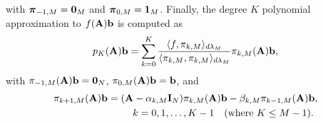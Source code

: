 \documentclass{article}
\begin{document}
with ${\boldsymbol \pi}_{-1,M}={\bf 0}_M$ and ${\boldsymbol \pi}_{0,M}={\bf 1}_M$.
Finally, the degree $K$ polynomial approximation to $f({\bf A}){\bf b}$ is computed as  
\begin{align*}
p_K({\bf A}){\bf b}=\sum_{k=0}^K \frac{\langle f,\pi_{k,M}\rangle_{d\lambda_M}}{\langle \pi_{k,M},\pi_{k,M} \rangle_{d\lambda_M}} \pi_{k,M}({\bf A}){\bf b},
\end{align*}
with $\pi_{-1,M}({\bf A}){\bf b}={\bf 0}_N$, $\pi_{0,M}({\bf A}){\bf b}={\bf b}$, and 
\begin{align*}
&\pi_{k+1,M}({\bf A}){\bf b}=({\bf A}-\alpha_{k,M}{\bf I}_N)\pi_{k,M}({\bf A}){\bf b}-\beta_{k,M} \pi_{k-1,M}({\bf A}){\bf b}, \\
&\hspace{1.1in}k=0,1,\ldots,K-1~~~(\hbox{where }K\leq M-1).
\end{align*}
\end{document}
